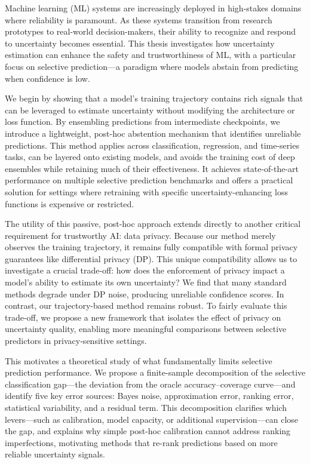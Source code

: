 \noindent Machine learning (ML) systems are increasingly deployed in high-stakes domains where reliability is paramount. As these systems transition from research prototypes to real-world decision-makers, their ability to recognize and respond to uncertainty becomes essential. This thesis investigates how uncertainty estimation can enhance the safety and trustworthiness of ML, with a particular focus on selective prediction—a paradigm where models abstain from predicting when confidence is low.

We begin by showing that a model’s training trajectory contains rich signals that can be leveraged to estimate uncertainty without modifying the architecture or loss function. By ensembling predictions from intermediate checkpoints, we introduce a lightweight, post-hoc abstention mechanism that identifies unreliable predictions. This method applies across classification, regression, and time-series tasks, can be layered onto existing models, and avoids the training cost of deep ensembles while retaining much of their effectiveness. It achieves state-of-the-art performance on multiple selective prediction benchmarks and offers a practical solution for settings where retraining with specific uncertainty-enhancing loss functions is expensive or restricted.

The utility of this passive, post-hoc approach extends directly to another critical requirement for trustworthy AI: data privacy. Because our method merely observes the training trajectory, it remains fully compatible with formal privacy guarantees like differential privacy (DP). This unique compatibility allows us to investigate a crucial trade-off: how does the enforcement of privacy impact a model's ability to estimate its own uncertainty? We find that many standard methods degrade under DP noise, producing unreliable confidence scores. In contrast, our trajectory-based method remains robust. To fairly evaluate this trade-off, we propose a new framework that isolates the effect of privacy on uncertainty quality, enabling more meaningful comparisons between selective predictors in privacy-sensitive settings.

This motivates a theoretical study of what fundamentally limits selective prediction performance. We propose a finite-sample decomposition of the selective classification gap—the deviation from the oracle accuracy–coverage curve—and identify five key error sources: Bayes noise, approximation error, ranking error, statistical variability, and a residual term. This decomposition clarifies which levers—such as calibration, model capacity, or additional supervision—can close the gap, and explains why simple post-hoc calibration cannot address ranking imperfections, motivating methods that re-rank predictions based on more reliable uncertainty signals.

